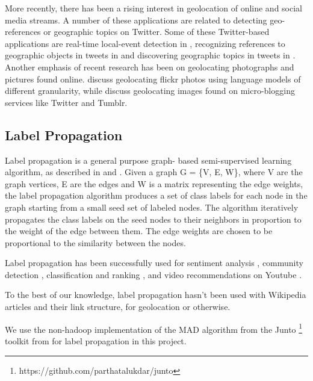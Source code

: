 \par More recently, there has been a rising interest in geolocation of online
and social media streams. A number of these applications are related to
detecting geo-references or geographic topics on Twitter. Some of these
Twitter-based applications are real-time local-event detection in
, recognizing references to geographic objects in
tweets in  and discovering geographic topics in tweets in
. Another emphasis of recent research has been on
geolocating photographs and pictures found online.
 discuss geolocating flickr photos using
language models of different granularity, while 
discuss geolocating images found on micro-blogging services like Twitter and
Tumblr.

\subsection{Label Propagation} 

Label propagation is a general purpose graph- based semi-supervised learning
algorithm, as described in  and .
Given a graph G = \{V, E, W\}, where V are the graph vertices, E are the edges
and W is a matrix representing the edge weights, the label propagation
algorithm produces a set of class labels for each node in the graph starting
from a small seed set of labeled nodes. The algorithm iteratively propagates
the class labels on the seed nodes to their neighbors in proportion to the
weight of the edge between them. The edge weights are chosen to be
proportional to the similarity between the nodes.

\par Label propagation has been successfully used for sentiment analysis
, community detection ,
classification and ranking , and video recommendations on
Youtube .

\par To the best of our knowledge, label propagation hasn't been used with
Wikipedia articles and their link structure, for geolocation or otherwise.


\par We use the non-hadoop implementation of the MAD algorithm from the Junto
\footnote{https://github.com/parthatalukdar/junto} toolkit from
 for label propagation in this project.
